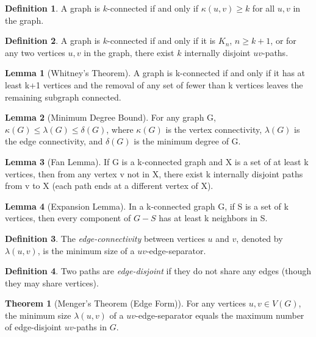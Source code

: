 \documentclass{article}
\theoremstyle{definition}
\newtheorem{theorem}{Theorem}
\newtheorem{lemma}{Lemma}
\newtheorem{definition}{Definition}
\begin{document}
\begin{definition}
A graph is $k$-connected if and only if $\kappa(u,v) \geq k$ for all $u,v$ in the graph.
\end{definition}

\begin{definition}
A graph is $k$-connected if and only if it is $K_n$, $n \geq k+1$, or for any two vertices $u, v$ in the graph, there exist $k$ internally disjoint $uv$-paths.
\end{definition}

\begin{lemma}[Whitney's Theorem]
A graph is k-connected if and only if it has at least k+1 vertices and the removal of any set of fewer than k vertices leaves the remaining subgraph connected.
\end{lemma}

\begin{lemma}[Minimum Degree Bound]
For any graph G, $\kappa(G) \leq \lambda(G) \leq \delta(G)$, where $\kappa(G)$ is the vertex connectivity, $\lambda(G)$ is the edge connectivity, and $\delta(G)$ is the minimum degree of G.
\end{lemma}

\begin{lemma}[Fan Lemma]
If G is a k-connected graph and X is a set of at least k vertices, then from any vertex v not in X, there exist k internally disjoint paths from v to X (each path ends at a different vertex of X).
\end{lemma}

\begin{lemma}[Expansion Lemma]
In a k-connected graph G, if S is a set of k vertices, then every component of $G - S$ has at least k neighbors in S.
\end{lemma}

\begin{definition}
The \textit{edge-connectivity} between vertices $u$ and $v$, denoted by $\lambda(u,v)$, is the minimum size of a $uv$-edge-separator.
\end{definition}

\begin{definition}
Two paths are \textit{edge-disjoint} if they do not share any edges (though they may share vertices).
\end{definition}


\begin{theorem}[Menger's Theorem (Edge Form)]
For any vertices $u,v \in V(G)$, the minimum size $\lambda(u,v)$ of a $uv$-edge-separator equals the maximum number of edge-disjoint $uv$-paths in $G$.
\end{theorem}
\end{document}
